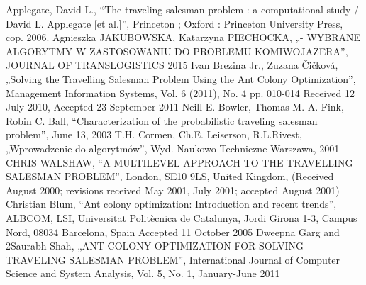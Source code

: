 \documentclass[12pt]{article} %
\begin{document}
\begin{thebibliography}{99}
Applegate, David L., “The traveling salesman problem : a computational study / David L. Applegate [et al.]”, Princeton ; Oxford : Princeton University Press, cop. 2006.
Agnieszka JAKUBOWSKA, Katarzyna PIECHOCKA, „- WYBRANE ALGORYTMY W ZASTOSOWANIU DO PROBLEMU KOMIWOJAŻERA”, JOURNAL OF TRANSLOGISTICS 2015
Ivan Brezina Jr., Zuzana Čičková, „Solving the Travelling Salesman Problem Using the Ant Colony Optimization”, Management Information Systems, Vol. 6 (2011), No. 4 pp. 010-014 Received 12 July 2010, Accepted 23 September 2011
Neill E. Bowler, Thomas M. A. Fink, Robin C. Ball, “Characterization of the probabilistic traveling salesman problem”, June 13, 2003
T.H. Cormen, Ch.E. Leiserson, R.L.Rivest, „Wprowadzenie do algorytmów”, Wyd. Naukowo-Techniczne Warszawa, 2001
CHRIS WALSHAW, “A MULTILEVEL APPROACH TO THE TRAVELLING SALESMAN PROBLEM”, London, SE10 9LS, United Kingdom, (Received August 2000; revisions received May 2001, July 2001; accepted August 2001)
Christian Blum, “Ant colony optimization: Introduction and recent trends”, ALBCOM, LSI, Universitat Politècnica de Catalunya, Jordi Girona 1-3, Campus Nord, 08034 Barcelona, Spain Accepted 11 October 2005
Dweepna Garg and 2Saurabh Shah, „ANT COLONY OPTIMIZATION FOR SOLVING TRAVELING SALESMAN PROBLEM”, International Journal of Computer Science and System Analysis, Vol. 5, No. 1, January-June 2011




\end{thebibliography}

\end{document}
